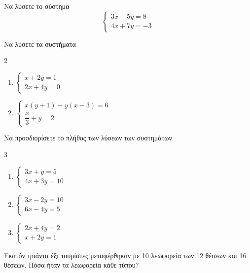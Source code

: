 \documentclass{presentation}
\begin{document}
\begin{askisi}
  Να λύσετε το σύστημα
  $$\begin{cases}
      3x-5y=8 \\
      4x+7y=-3
    \end{cases}$$
\end{askisi}

\begin{askisi}
  Να λύσετε τα συστήματα
  \begin{multicols}{2}
    \begin{enumerate}[<+->]
      \item
            $\begin{cases}
                x+2y=1 \\
                2x+4y=0
              \end{cases}$
      \item
            $\begin{cases}
                x(y+1)-y(x-3)=6 \\
                \dfrac{x}{3}+y=2
              \end{cases}$
    \end{enumerate}
  \end{multicols}
\end{askisi}

\begin{askisi}
  Να προσδιορίσετε το πλήθος των λύσεων των συστημάτων
  \begin{multicols}{3}
    \begin{enumerate}[<+->]
      \item
            $\begin{cases}
                3x+y=5 \\
                4x+3y=10
              \end{cases}$
      \item
            $\begin{cases}
                3x-2y=10 \\
                6x-4y=5
              \end{cases}$
      \item
            $\begin{cases}
                2x+4y=2 \\
                x+2y=1
              \end{cases}$
    \end{enumerate}
  \end{multicols}
\end{askisi}

\begin{askisi}
  Εκατόν τριάντα έξι τουρίστες μεταφέρθηκαν με 10 λεωφορεία των 12 θέσεων και 16 θέσεων. Πόσα ήταν τα λεωφορεία κάθε τύπου?
\end{askisi}

\moodle
\end{document}
